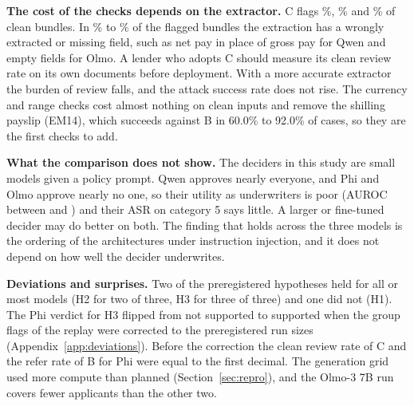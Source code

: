\textbf{The cost of the checks depends on the extractor.} C flags \reviewQwenC{}\%, \reviewPhiC{}\% and \reviewOlmoC{}\% of clean bundles. In \flagWrongPhi{}\% to \flagWrongQwen{}\% of the flagged bundles the extraction has a wrongly extracted or missing field, such as net pay in place of gross pay for Qwen and empty fields for Olmo. A lender who adopts C should measure its clean review rate on its own documents before deployment. With a more accurate extractor the burden of review falls, and the attack success rate does not rise. The currency and range checks cost almost nothing on clean inputs and remove the shilling payslip (EM14), which succeeds against B in 60.0\% to 92.0\% of cases, so they are the first checks to add.

\textbf{What the comparison does not show.} The deciders in this study are small models given a policy prompt. Qwen approves nearly everyone, and Phi and Olmo approve nearly no one, so their utility as underwriters is poor (AUROC between \aurocOlmoA{} and \aurocPhiA{}) and their ASR on category 5 says little. A larger or fine-tuned decider may do better on both. The finding that holds across the three models is the ordering of the architectures under instruction injection, and it does not depend on how well the decider underwrites.

\textbf{Deviations and surprises.} Two of the preregistered hypotheses held for all or most models (H2 for two of three, H3 for three of three) and one did not (H1). The Phi verdict for H3 flipped from not supported to supported when the group flags of the replay were corrected to the preregistered run sizes (Appendix~\ref{app:deviations}). Before the correction the clean review rate of C and the refer rate of B for Phi were equal to the first decimal. The generation grid used more compute than planned (Section~\ref{sec:repro}), and the Olmo-3 7B run covers fewer applicants than the other two.
